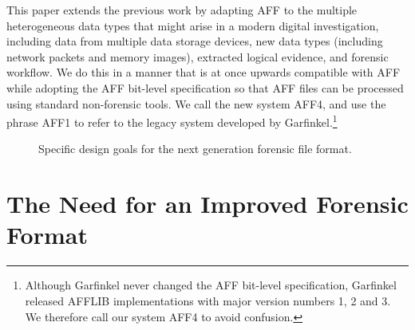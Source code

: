 \documentclass[10pt, conference]{IEEEtran}
\begin{document}
This paper extends the previous work by adapting AFF to the multiple
heterogeneous data types that might arise in a modern digital
investigation, including data from multiple data storage devices, new
data types (including network packets and memory images), extracted
logical evidence, and forensic workflow. We do this in a manner that
is at once upwards compatible with AFF while adopting the AFF
bit-level specification so that AFF files can be processed using
standard non-forensic tools.  We call the new system AFF4, and use the
phrase AFF1 to refer to the legacy system developed by
Garfinkel.\footnote{Although Garfinkel never changed the AFF bit-level
specification, Garfinkel released AFFLIB implementations with major
version numbers 1, 2 and 3. We therefore call our system AFF4 to avoid confusion.}

\begin{figure}
\caption{Specific design goals for the next generation forensic file
  format.}
\end{figure}
\section{The Need for an Improved Forensic Format}
\end{document}
